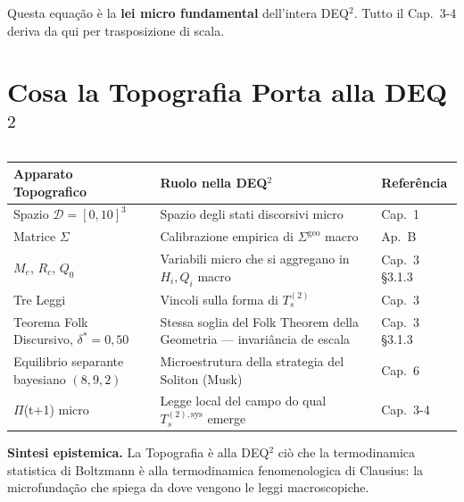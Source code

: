\Proved{} Questa equação è la \textbf{lei micro fundamental}
dell'intera DEQ$^2$. Tutto il Cap.~3-4 deriva da qui per trasposizione di
scala.



\section{Cosa la Topografia Porta alla
DEQ$^2$}\label{cosa-la-topografia-porta-alla-dequxb2}

{\def\LTcaptype{none} %
{\small\begin{longtable}[]{@{}
  >{\raggedright\arraybackslash}p{}
  >{\raggedright\arraybackslash}p{}
  >{\raggedright\arraybackslash}p{}@{}}
\toprule\noalign{}
\begin{minipage}[b]{\linewidth}\raggedright
Apparato Topografico
\end{minipage} & \begin{minipage}[b]{\linewidth}\raggedright
Ruolo nella DEQ$^2$
\end{minipage} & \begin{minipage}[b]{\linewidth}\raggedright
Referência
\end{minipage} \\
\midrule\noalign{}
\endhead
\bottomrule\noalign{}
\endlastfoot
Spazio \(\mathcal{D} = [0, 10]^3\) & Spazio degli stati discorsivi micro
& Cap.~1 \\
Matrice \(\Sigma\) & Calibrazione empirica di \(\Sigma^{\text{geo}}\)
macro & Ap.~B \\
\(M_e\), \(R_c\), \(Q_0\) & Variabili micro che si aggregano in
\(H_i, Q_i\) macro & Cap.~3 \S{}3.1.3 \\
Tre Leggi & Vincoli sulla forma di \(T_s^{(2)}\) & Cap.~3 \\
Teorema Folk Discursivo, \(\delta^* = 0{,}50\) & Stessa soglia del Folk
Theorem della Geometria --- invariância de escala & Cap.~3 \S{}3.1.3 \\
Equilibrio separante bayesiano \((8, 9, 2)\) & Microestrutura della
strategia del Soliton (Musk) & Cap.~6 \\
$\Pi$(t+1) micro & Legge local del campo do qual \(T_s^{(2),\text{sys}}\)
emerge & Cap.~3-4 \\
\end{longtable}}
}

\Hypoth{} \textbf{Sintesi epistemica.} La Topografia è alla DEQ$^2$ ciò che
la termodinamica statistica di Boltzmann è alla termodinamica
fenomenologica di Clausius: la microfundação che spiega da dove
vengono le leggi macroscopiche.




